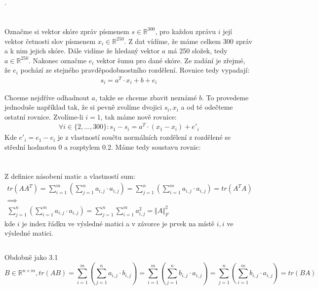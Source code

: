 \documentclass[12pt, a4paper]{article}
\begin{document}
\section{}
.

\section{}
Označme si vektor skóre zpráv písmenem $s \in \mathbb{R}^{300}$, pro každou zprávu $i$ její vektor četnosti slov písmenem $x_i \in \mathbb{R}^{250}$. Z dat vídíme, že máme celkem 300 zpráv a k nim jejich skóre. Dále vidíme že hledaný vektor $a$ má 250 složek, tedy $a \in \mathbb{R}^{250}$. Nakonec označme $e_i$ vektor šumu pro dané skóre. Ze zadání je zřejmé, že $e_i$ pochází ze stejného pravděpodobnostního rozdělení. Rovnice tedy vypadají:
\begin{gather*}
s_i = a^T \cdot x_i + b + e_i
\end{gather*}

Chceme nejdříve odhadnout $a$, takže se chceme zbavit neznámé $b$. To provedeme jednoduše například tak, že si pevně zvolíme dvojici $s_i, x_i$ a od té odečteme ostatní rovnice. Zvolíme-li $i=1$, tak máme nově rovnice:
\begin{gather*}
\forall i \in \{2,\dots, 300\}: s_1-s_i = a^T \cdot (x_1-x_i) + e'_i
\end{gather*}
Kde $e'_i = e_1-e_i$ je z vlastností součtu normálních rozdělení z rozdělené se střední hodnotou 0 a rozptylem 0.2. Máme tedy soustavu rovnic:


\section{}
\subsection{}
Z definice násobení matic a vlastností sum:
\begin{gather*}
tr(AA^T) = \sum_{i=1}^{m}(\sum_{j=1}^{n} a_{i,j} \cdot a_{i,j}) = \sum_{j=1}^{n}(\sum_{i=1}^{m} a_{i,j} \cdot a_{i,j}) = tr(A^TA) \\
\implies \\
\sum_{j=1}^{n}(\sum_{i=1}^{m} a_{i,j} \cdot a_{i,j}) = \sum_{j=1}^{n}\sum_{i=1}^{m} a_{i,j}^2 = {\Vert A \Vert}_F^2
\end{gather*}
kde $i$ je index řádku ve výsledné matici a v závorce je prvek na místě $i,i$ ve výsledné matici.
\subsection{}
Obdobně jako 3.1
\[ B \in \mathbb{R}^{n \times m}, tr(AB)= \sum_{i=1}^{m}(\sum_{j=1}^{n} a_{i,j} \cdot b_{i,j}) = \sum_{i=1}^{m}(\sum_{j=1}^{n} b_{i,j} \cdot a_{i,j}) = \sum_{j=1}^{n}(\sum_{i=1}^{m} b_{i,j} \cdot a_{i,j}) = tr(BA)\]
\end{document}
